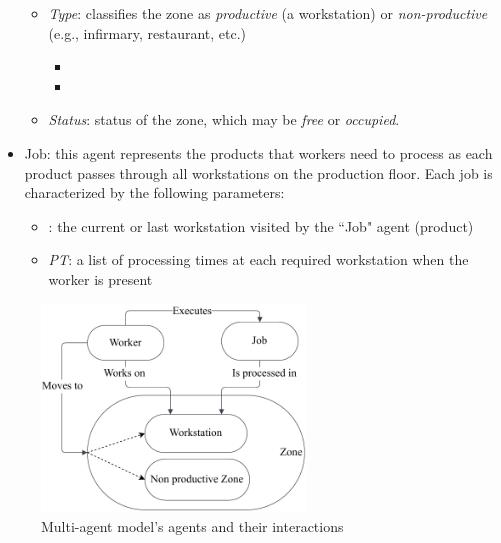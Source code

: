 \documentclass[review,12pt, 3p, times]{elsarticle}
\begin{document}
\begin{itemize}
    \begin{itemize}
        \item\textit{Type}: classifies the zone as \textit{productive} (a workstation) or \textit{non-productive} (e.g., infirmary, restaurant, etc.)
        \begin{itemize}
            \item {}
            \item {}
        \end{itemize}
        
        \item\textit{Status}: status of the zone, which may be  \textit{free} or \textit{occupied}. 
    \end{itemize}
    \item Job: this agent represents the products  that workers need to process as each product passes through all workstations on the production floor. Each job is characterized by the following parameters:
    \begin{itemize}
        \item\textit{}: the current or last workstation visited by the “Job" agent (product)
	\item\textit{PT}: a list of processing times at each required workstation when the worker is present
    \end{itemize}
\end{itemize}		      			
\begin{figure}[htbp]
	\centering
	\includegraphics[trim=00 00 00 00, clip, width=7cm]{AgentsInteractions.pdf}
	\caption{Multi-agent model's agents and their interactions}
	
	\label{fig:interaction}
\end{figure}
	
\end{document}
